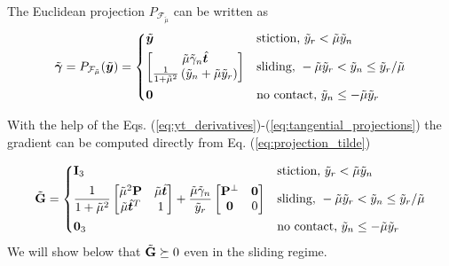 
The Euclidean projection $P_{\mathcal{F}_{\tilde{\mu}}}$ can be written as
	\begin{equation}
		\tilde{\bgamma} = P_{\mathcal{F}_{\tilde{\mu}}}(\tilde{\vf{y}}) = 
	\begin{dcases}
		\tilde{\vf{y}}
		& \text{stiction, } \tilde{y}_r < \tilde{\mu} \tilde{y}_n\\
		\begin{bmatrix}
			\tilde{\mu}\tilde{\gamma}_n\hat{\vf{t}}\\
			\frac{1}{1+\tilde\mu^2}\left(\tilde{y}_n +
		\tilde\mu\tilde{y}_r\right)
		\end{bmatrix}
		& \text{sliding, } -\tilde\mu \tilde{y}_r < \tilde{y}_n \leq \tilde{y}_r/\tilde\mu\\
		\vf{0} & \text{no contact, } \tilde{y}_n \leq -\tilde\mu\tilde{y}_r
	\end{dcases}	  
		\label{eq:projection_tilde}
	\end{equation}
	
With the help of the Eqs.
(\ref{eq:yt_derivatives})-(\ref{eq:tangential_projections}) the gradient can be
computed directly from Eq. (\ref{eq:projection_tilde})

\begin{equation}
	\sGtilde = 
	\begin{dcases}
		\mf{I}_3
		& \text{stiction, } \tilde{y}_r < \tilde{\mu} \tilde{y}_n\\
		\frac{1}{1+\tilde\mu^2}
		\begin{bmatrix}
			\tilde\mu^2\mf{P} & \tilde\mu\sthat\\
			\tilde\mu\sthat^T & 1
		\end{bmatrix} +
		\frac{\tilde\mu\tilde\gamma_n}{\tilde{y}_r}
		\begin{bmatrix}
			\mf{P}^\perp & \mf{0}\\
			\mf{0} & 0
		\end{bmatrix}
		& \text{sliding, } -\tilde\mu \tilde{y}_r < \tilde{y}_n \leq \tilde{y}_r/\tilde\mu\\
		\mf{0}_3 & \text{no contact, } \tilde{y}_n \leq -\tilde\mu\tilde{y}_r
	\end{dcases}
	\label{eq:Gtilde}
\end{equation}
We will show below that $\tilde{{\mathbf{G}}}\succeq 0$ even in the sliding regime.

